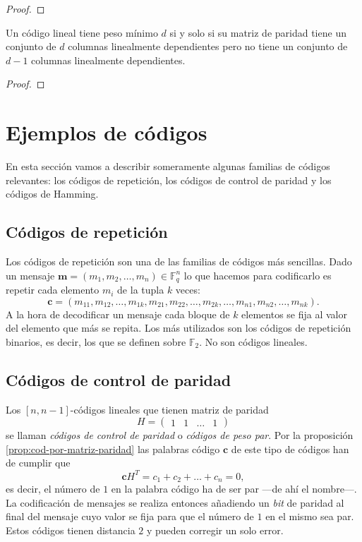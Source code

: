 \begin{proof}
  
\end{proof}

\begin{corollary}
  \label{cor:peso-minimo-columnas-dependientes}
  Un código lineal tiene peso mínimo \(d\) si y solo si su matriz de paridad tiene un conjunto de \(d\) columnas linealmente dependientes pero no tiene un conjunto de \(d-1\) columnas linealmente dependientes.
\end{corollary}

\begin{proof}
  
\end{proof}


\section{Ejemplos de códigos}

En esta sección vamos a describir someramente algunas familias de códigos relevantes: los códigos de repetición, los códigos de control de paridad y los códigos de Hamming.

\subsection{Códigos de repetición}

Los códigos de repetición son una de las familias de códigos más sencillas.
Dado un mensaje \(\mathbf{m} = (m_1, m_2, \dots, m_n) \in \mathbb F_q^n\) lo que hacemos para codificarlo es repetir cada elemento \(m_i\) de la tupla \(k\) veces: 
\[
  \mathbf{c} = (m_{11}, m_{12}, \dots, m_{1k}, m_{21}, m_{22}, \dots, m_{2k}, \dots, m_{n1}, m_{n2}, \dots, m_{nk}).
\]
A la hora de decodificar un mensaje cada bloque de \(k\) elementos se fija al valor del elemento que más se repita. 
Los más utilizados son los códigos de repetición binarios, es decir, los que se definen sobre \(\mathbb F_2\).
No son códigos lineales.

\subsection{Códigos de control de paridad}

Los \([n, n -1]\)-códigos lineales que tienen matriz de paridad \[
  H = \begin{pmatrix}
    1 & 1 & \dots & 1
  \end{pmatrix}
\] se llaman \textit{códigos de control de paridad} o \textit{códigos de peso par}.
Por la proposición \ref{prop:cod-por-matriz-paridad} las palabras código \(\mathbf{c}\) de este tipo de códigos han de cumplir que
\[
  \mathbf{c}H^T = c_1 + c_2 + \dots + c_n = 0,
\]
es decir, el número de \(1\) en la palabra código ha de ser par —de ahí el nombre—.
La codificación de mensajes se realiza entonces añadiendo un \textit{bit} de paridad al final del mensaje cuyo valor se fija para que el número de \(1\) en el mismo sea par.
Estos códigos tienen distancia \(2\) y pueden corregir un solo error.

